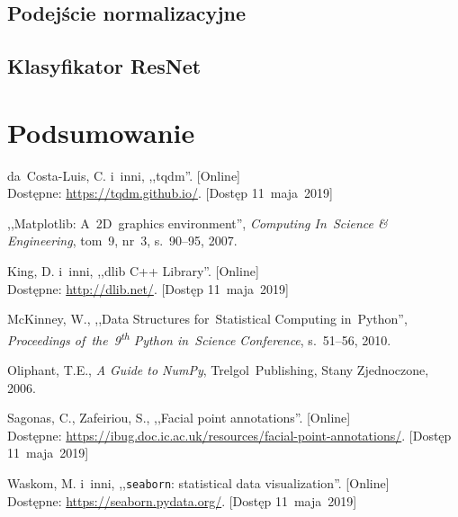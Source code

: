 \documentclass[11pt,a4paper]{article}
\begin{document}
\subsection{Podejście normalizacyjne}

\subsection{Klasyfikator ResNet}

\section{Podsumowanie}

\begin{thebibliography}{9}

        da~Costa-Luis, C. i~inni,
        ,,tqdm''.
        [Online]
        \\
        Dostępne: \url{https://tqdm.github.io/}.
        [Dostęp 11~maja~2019]

        ,,Matplotlib: A~2D~graphics environment'',
        \emph{Computing In~Science \& Engineering},
        tom~9,
        nr~3,
        s.~90--95,
        2007.

        King, D. i~inni,
        ,,dlib C++ Library''.
        [Online]
        \\
        Dostępne: \url{http://dlib.net/}.
        [Dostęp 11~maja~2019]

        McKinney, W.,
        ,,Data Structures for~Statistical Computing in~Python'',
        \emph{Proceedings of~the~9\textsuperscript{th} Python in~Science Conference},
        s.~51--56,
        2010.

        Oliphant, T.E.,
        \emph{A Guide to NumPy},
        Trelgol~Publishing,
        Stany Zjednoczone,
        2006.

        Sagonas, C.,
        Zafeiriou, S.,
        ,,Facial point annotations''.
        [Online]
        \\
        Dostępne: \url{https://ibug.doc.ic.ac.uk/resources/facial-point-annotations/}.
        [Dostęp 11~maja~2019]

        Waskom, M. i~inni,
        ,,\texttt{seaborn}: statistical data visualization''.
        [Online]
        \\
        Dostępne: \url{https://seaborn.pydata.org/}.
        [Dostęp 11~maja~2019]

\end{thebibliography}
\end{document}
